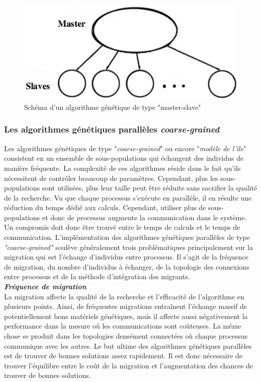	\begin{figure}[!h]
		\begin{center}
			\includegraphics[scale=.3]{images/master_slave_ga.png}
			\caption{Schéma d'un algorithme génétique de type "master-slave" \cite{cant}}
			\label{fig:master_slave_ga}
		\end{center}
	\end{figure}
 
	\subsubsection{Les algorithmes génétiques parallèles \emph{coarse-grained}}
	
	Les algorithmes génétiques de type "\emph{coarse-grained}" ou encore "\emph{modèle de l'île}" consistent en un ensemble de sous-populations qui échangent des individus de manière fréquente. La complexité de ces algorithmes réside dans le fait qu'ils nécessitent de contrôler beaucoup de paramètres. Cependant, plus les sous-populations sont utilisées, plus leur taille peut être réduite sans sacrifier la qualité de la recherche. Vu que chaque processus s'exécute en parallèle, il en résulte une réduction du temps dédié aux calculs. Cependant, utiliser plus de sous-populations et donc de processus augmente la communication dans le système. Un compromis doit donc être trouvé entre le temps de calculs et le temps de communication. L'implémentation des algorithmes génétiques parallèles de type \emph{"coarse-grained"} soulève généralement trois problématiques principalement sur la migration qui est l'échange d'individus entre processus. Il s'agit de la fréquence de migration, du nombre d'individus à échanger, de la topologie des connexions entre processus et de la méthode d'intégration des migrants.\\

	\textsl{\textbf{Fréquence de migration}} \\
	La migration affecte la qualité de la recherche et l'efficacité de l'algorithme en plusieurs points. Ainsi, de fréquentes migrations entraînent l'échange massif de potentiellement bons matériels génétiques, mais il affecte aussi négativement la performance dans la mesure où les communications sont coûteuses. La même chose se produit dans les topologies densément connectées où chaque processus communique avec les autres. Le but ultime des algorithmes génétiques parallèles est de trouver de bonnes solutions assez rapidement. Il est donc nécessaire de trouver l'équilibre entre le coût de la migration et l'augmentation des chances de trouver de bonnes solutions.\\
	
